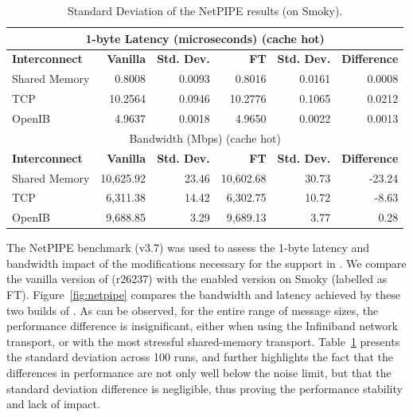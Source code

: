 \begin{table}%
\begin{center}\sf\scriptsize
\begin{tabular}{|l||r|r||r|r||r|}
\multicolumn{6}{c}{1-byte Latency (microseconds) (cache hot)} \\
\hline
\cellcolor[gray]{0.7}\textbf{Interconnect}  & \cellcolor[gray]{0.7}\textbf{Vanilla}   & \cellcolor[gray]{0.7}\textbf{Std. Dev.} &
\cellcolor[gray]{0.7}\textbf{FT}            & \cellcolor[gray]{0.7}\textbf{Std. Dev.} & \cellcolor[gray]{0.7}\textbf{Difference} \\
\hline
\cellcolor[gray]{0.9}Shared Memory &  0.8008 & 0.0093 &  0.8016 & 0.0161 &  0.0008 \\
\cellcolor[gray]{0.9}TCP           & 10.2564 & 0.0946 & 10.2776 & 0.1065 &  0.0212 \\
\cellcolor[gray]{0.9}OpenIB        &  4.9637 & 0.0018 &  4.9650 & 0.0022 &  0.0013 \\
\hline
\multicolumn{6}{c}{Bandwidth (Mbps) (cache hot)} \\
\hline
\cellcolor[gray]{0.7}\textbf{Interconnect}  & \cellcolor[gray]{0.7}\textbf{Vanilla}   & \cellcolor[gray]{0.7}\textbf{Std. Dev.} &
\cellcolor[gray]{0.7}\textbf{FT}            & \cellcolor[gray]{0.7}\textbf{Std. Dev.} & \cellcolor[gray]{0.7}\textbf{Difference} \\
\hline
\cellcolor[gray]{0.9}Shared Memory &  10,625.92 &  23.46 &  10,602.68 & 30.73 & -23.24 \\
\cellcolor[gray]{0.9}TCP           &   6,311.38 &  14.42 &   6,302.75 & 10.72 &  -8.63 \\
\cellcolor[gray]{0.9}OpenIB        &   9,688.85 &   3.29 &   9,689.13 &  3.77 &   0.28 \\
\hline
\end{tabular}
\end{center}
\caption{Standard Deviation of the NetPIPE results (on Smoky).\label{tab:netpipe}}%
\end{table}

The NetPIPE benchmark (v3.7) was used to assess the 1-byte latency and
bandwidth impact of the modifications necessary for the \ulfm support in
\ompi. We compare the vanilla version of \ompi (r26237) with the \ulfm
enabled version on Smoky (labelled as FT). Figure~\ref{fig:netpipe} compares the
bandwidth and latency achieved by these two builds of \ompi. As can be
observed, for the entire range of message sizes, the performance
difference is insignificant, either when using the Infiniband network
transport, or with the most stressful shared-memory transport.
Table~\ref{tab:netpipe} presents the standard deviation across 100 runs,
and further highlights the fact that the differences in performance are
not only well below the noise limit, but that the standard deviation
difference is negligible, thus proving the performance stability and
lack of impact.


